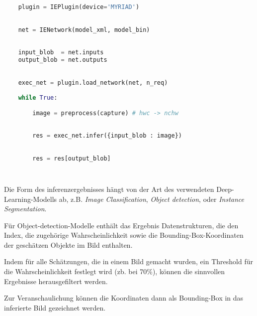 \vspace{1cm}
\begin{minipage}{0.30\textwidth}
    \centering
    
    \label{fig:inger_engine_workflow}
\end{minipage}
\begin{minipage}{0.70\textwidth}

\begin{lstlisting}[language=Python]

    plugin = IEPlugin(device='MYRIAD')

        
    net = IENetwork(model_xml, model_bin)
        
    
    input_blob  = net.inputs
    output_blob = net.outputs
        

    exec_net = plugin.load_network(net, n_req)
        
    while True:

        image = preprocess(capture) # hwc -> nchw
        
        
        res = exec_net.infer({input_blob : image})
        

        res = res[output_blob]
        
        
\end{lstlisting}
\vspace{1.5cm}
\end{minipage}
\vspace{1cm}


Die Form des \Gls{inferenz}ergebnisses hängt von der 
Art des verwendeten Deep-Learning-Modells ab, z.B.
\textit{Image Classification}, \textit{Object detection},
oder \textit{Instance
Segmentation}.

Für Object-detection-Modelle enthält das Ergebnis
 Datenstrukturen, die den Index, 
 die zugehörige Wahrscheinlichkeit sowie die 
 Bounding-Box-Koordinaten der geschätzen Objekte im Bild enthalten.

Indem für alle Schätzungen, die in einem Bild gemacht wurden, 
ein Threshold für die Wahrscheinlichkeit festlegt wird (zb. bei 70\%),
können die sinnvollen Ergebnisse herausgefiltert werden.

Zur Veranschaulichung können die Koordinaten dann 
als Bounding-Box in das inferierte Bild gezeichnet werden.
